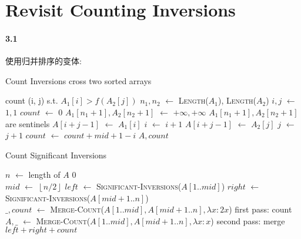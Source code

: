 \documentclass{ctexart}
\newcommand{\floor}[1]{\left\lfloor#1\right\rfloor}
\newcommand{\Let}[1]{\State #1 $\gets$}
\newcommand{\F}[2]{\textsc{#1}(#2)}
\newcommand{\Ret}[1]{\State \textbf{return} #1}
\begin{document}
\section{Revisit Counting Inversions}

\paragraph*{3.1} 使用归并排序的变体:

\begin{algorithm}[H]
    \caption{Count Inversions cross two sorted arrays}
    \begin{algorithmic}
        \Comment count (i, j) s.t. $A_1[i] > f(A_2[j])$
        \Let{$n_1, n_2$} \F{Length}{$A_1$}, \F{Length}{$A_2$}
        \Let{$i, j$} $1, 1$
        \Let{$count$} $0$
        \Let{$A_1[n_1+1], A_2[n_2+1]$} $+\infty, +\infty$
        \Comment $A_1[n_1+1], A_2[n_2+1]$ are sentinels
                \Let{$A[i+j-1]$} $A_1[i]$
                \Let{$i$} $i+1$
            \Else
                \Let{$A[i+j-1]$} $A_2[j]$
                \Let{$j$} $j+1$
                \Let{$count$} $count + mid+1-i$
            \EndIf
        \EndWhile
        \Ret $A, count$
        \EndFunction
    \end{algorithmic}
\end{algorithm}



\begin{algorithm}[H]
    \caption{Count Significant Inversions}
    \begin{algorithmic}
        \Let{$n$} length of $A$
            \Ret $0$
        \EndIf
        \\
        \Let{$mid$} $\floor{n/2}$
        \Let{$left$} \F{Significant-Inversions}{$A[1..mid]$}
        \Let{$right$} \F{Significant-Inversions}{$A[mid+1..n]$}
        \\
        \Let{$\_, count$} \F{Merge-Count}{$A[1..mid], A[mid+1..n], \lambda x: 2x$}
        \Comment first pass: count
        \Let{$A, \_$} \F{Merge-Count}{$A[1..mid], A[mid+1..n], \lambda x: x$}
        \Comment second pass: merge
        \\
        \Ret $left+right+count$
        \EndFunction
    \end{algorithmic}
\end{algorithm}
\end{document}
